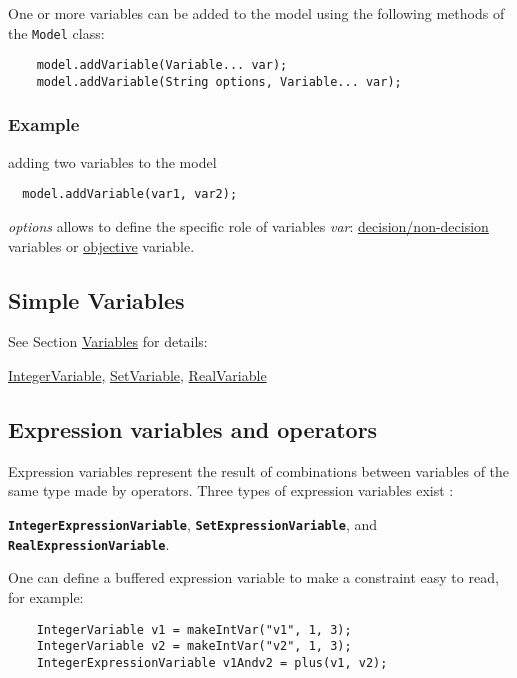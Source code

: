 One or more variables can be added to the model using the following methods of the \texttt{Model} class:
\begin{lstlisting}
	model.addVariable(Variable... var);
	model.addVariable(String options, Variable... var);
\end{lstlisting} 
\subsubsection{Example} adding two variables to the model
\begin{lstlisting}
  model.addVariable(var1, var2);
\end{lstlisting}
\emph{options} allows to define the specific role of variables \emph{var}:  \hyperlink{model:decisionvariables}{decision/non-decision} variables or  \hyperlink{model:objectivevariable}{objective} variable.

\subsection{Simple Variables}\label{model:simplevariables}\hypertarget{model:simplevariables}{}
See Section \hyperlink{ch:vars}{Variables} for details:
\begin{notedef}
\hyperlink{integervariable}{IntegerVariable}, \hyperlink{setvariable}{SetVariable}, \hyperlink{realvariable}{RealVariable}
\end{notedef}


\subsection{Expression variables and operators}\label{model:expressionvariables}\hypertarget{model:expressionvariables}{}
Expression variables represent the result of combinations between variables of the same type made by operators. Three types of expression variables exist : 
\begin{notedef}
\textbf{\tt IntegerExpressionVariable}, \textbf{\tt SetExpressionVariable}, and \textbf{\tt RealExpressionVariable}.
\end{notedef}
One can define a buffered expression variable to make a constraint easy to read, for example:
\begin{lstlisting}
	IntegerVariable v1 = makeIntVar("v1", 1, 3);
	IntegerVariable v2 = makeIntVar("v2", 1, 3);
	IntegerExpressionVariable v1Andv2 = plus(v1, v2);
\end{lstlisting}


